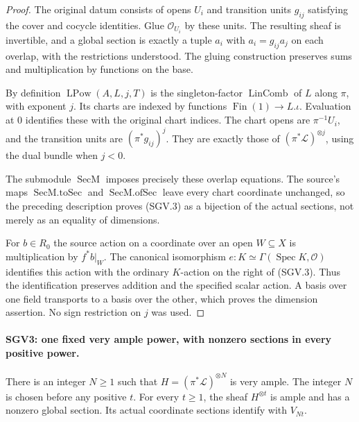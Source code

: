\documentclass[11pt,a4paper]{article}
\numberwithin{equation}{section}
\theoremstyle{remark}\newtheorem{remark}[theorem]{Remark}
\begin{document}
\begin{proof}
The original datum consists of opens $U_i$ and transition units
$g_{ij}$ satisfying the cover and cocycle identities.  Glue
$\mathcal O_{U_i}$ by these units.  The resulting sheaf is invertible,
and a global section is exactly a tuple $a_i$ with
$a_i=g_{ij}a_j$ on each overlap, with the restrictions understood.
The gluing construction preserves sums and multiplication by
functions on the base.

By definition $\operatorname{LPow}(A,L,j,T)$ is the
singleton-factor $\operatorname{LinComb}$ of $L$ along $\pi$,
with exponent $j$.  Its charts are indexed by functions
$\operatorname{Fin}(1)\to L.\iota$.  Evaluation at $0$ identifies
these with the original chart indices.  The chart opens are
$\pi^{-1}U_i$, and the transition units are $(\pi^*g_{ij})^j$.
They are exactly those of $(\pi^*\mathcal L)^{\otimes j}$,
using the dual bundle when $j<0$.

The submodule $\operatorname{SecM}$ imposes precisely these overlap
equations.  The source's maps $\operatorname{SecM.toSec}$ and
$\operatorname{SecM.ofSec}$ leave every chart coordinate unchanged,
so the preceding description proves (SGV.3) as a bijection of the
actual sections, not merely as an equality of dimensions.

For $b\in R_0$ the source action on a coordinate over an open
$W\subseteq X$ is multiplication by $f^*b|_W$.
The canonical isomorphism
$e:K\simeq\Gamma(\operatorname{Spec}K,\mathcal O)$ identifies
this action with the ordinary $K$-action on the right of (SGV.3).
Thus the identification preserves addition and the specified scalar
action.  A basis over one field transports to a basis over the other,
which proves the dimension assertion.  No sign restriction on $j$
was used.
\end{proof}

\paragraph{SGV3: one fixed very ample power, with nonzero sections in every positive power.}
\label{claim:SGV3}
There is an integer $N\ge1$ such that
$H=(\pi^*\mathcal L)^{\otimes N}$ is very ample.
The integer $N$ is chosen before any positive $t$.  For every
$t\ge1$, the sheaf $H^{\otimes t}$ is ample and has a nonzero
global section.  Its actual coordinate sections identify with $V_{Nt}$.
\end{document}
